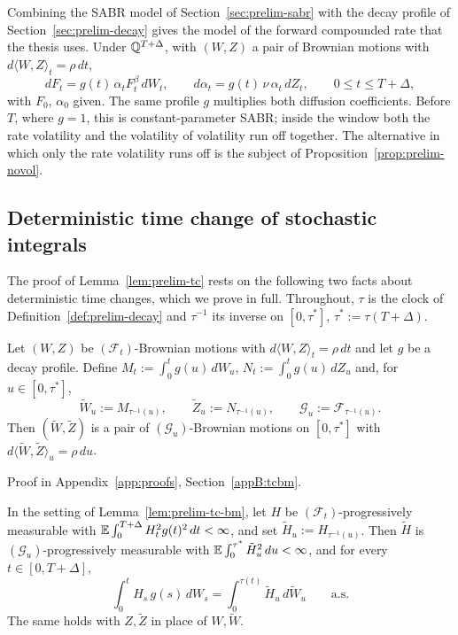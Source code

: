 \documentclass[../../../main.tex]{subfiles}
\begin{document}
Combining the SABR model of Section~\ref{sec:prelim-sabr} with the decay profile of Section~\ref{sec:prelim-decay} gives the model of the forward compounded rate that the thesis uses. Under $\mathbb{Q}^{T+\Delta}$, with $(W,Z)$ a pair of Brownian motions with $d\langle W,Z\rangle_t=\rho\,dt$,
\begin{equation}\label{eq:prelim-sabr-decay}
dF_t=g(t)\,\alpha_tF_t^{\beta}\,dW_t,\qquad d\alpha_t=g(t)\,\nu\,\alpha_t\,dZ_t,\qquad 0\le t\le T+\Delta,
\end{equation}
with $F_0$, $\alpha_0$ given. The same profile $g$ multiplies both diffusion coefficients. Before $T$, where $g=1$, this is constant-parameter SABR; inside the window both the rate volatility and the volatility of volatility run off together. The alternative in which only the rate volatility runs off is the subject of Proposition~\ref{prop:prelim-novol}.

\subsection{Deterministic time change of stochastic integrals}

The proof of Lemma~\ref{lem:prelim-tc} rests on the following two facts about deterministic time changes, which we prove in full. Throughout, $\tau$ is the clock of Definition~\ref{def:prelim-decay} and $\tau^{-1}$ its inverse on $[0,\tau^*]$, $\tau^*:=\tau(T+\Delta)$.

\begin{lemma}\label{lem:prelim-tc-bm}
Let $(W,Z)$ be $(\mathcal F_t)$-Brownian motions with $d\langle W,Z\rangle_t=\rho\,dt$ and let $g$ be a decay profile. Define $M_t:=\int_0^tg(u)\,dW_u$, $N_t:=\int_0^tg(u)\,dZ_u$ and, for $u\in[0,\tau^*]$,
\[
\tilde W_u:=M_{\tau^{-1}(u)},\qquad \tilde Z_u:=N_{\tau^{-1}(u)},\qquad \mathcal G_u:=\mathcal F_{\tau^{-1}(u)} .
\]
Then $(\tilde W,\tilde Z)$ is a pair of $(\mathcal G_u)$-Brownian motions on $[0,\tau^*]$ with $d\langle\tilde W,\tilde Z\rangle_u=\rho\,du$.
\end{lemma}

Proof in Appendix~\ref{app:proofs}, Section~\ref{appB:tcbm}.

\begin{lemma}\label{lem:prelim-tc-int}
In the setting of Lemma~\ref{lem:prelim-tc-bm}, let $H$ be $(\mathcal F_t)$-progressively measurable with $\mathbb{E}\int_0^{T+\Delta}H_t^2g(t)^2\,dt<\infty$, and set $\tilde H_u:=H_{\tau^{-1}(u)}$. Then $\tilde H$ is $(\mathcal G_u)$-progressively measurable with $\mathbb{E}\int_0^{\tau^*}\tilde H_u^2\,du<\infty$, and for every $t\in[0,T+\Delta]$,
\begin{equation}\label{eq:prelim-tc-int}
\int_0^tH_s\,g(s)\,dW_s=\int_0^{\tau(t)}\tilde H_u\,d\tilde W_u\qquad\text{a.s.}
\end{equation}
The same holds with $Z,\tilde Z$ in place of $W,\tilde W$.
\end{lemma}
\end{document}
